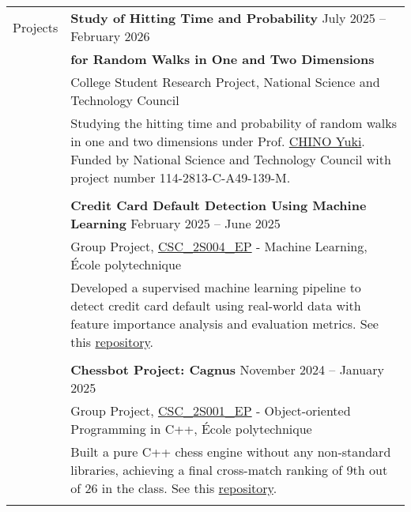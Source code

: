 \documentclass[letterpaper, 11pt]{article}
\begin{document}
\begin{center}
\begin{longtable}{p{0.76in}p{5.93in}}
        

        {\textcolor{OliveGreen}{Projects}} & \textbf{Study of Hitting Time and Probability} \hfill July 2025 -- February 2026\\
        & \textbf{\quad \quad \quad for Random Walks in One and Two Dimensions} \\
        & College Student Research Project, National Science and Technology Council\\
        & Studying the hitting time and probability of random walks in one and two dimensions under Prof. \href{https://scholar.nycu.edu.tw/en/persons/yuki-chino}{CHINO Yuki}. Funded by National Science and Technology Council with project number 114-2813-C-A49-139-M.\\
        & \\
        

        & \textbf{Credit Card Default Detection Using Machine Learning} \hfill February 2025 -- June 2025\\
        & Group Project, \href{https://synapses.polytechnique.fr/catalogue/2024-2025/ue/47/CSC-2S004-EP-machine-learning?from=D12}{CSC\_2S004\_EP} - Machine Learning, École polytechnique\\
        & Developed a supervised machine learning pipeline to detect credit card default using real-world data with feature importance analysis and evaluation metrics. See this \href{https://github.com/eiken59/ml_project/blob/main/README.md}{repository}.\\
        & \\

        & \textbf{Chessbot Project: Cagnus} \hfill November 2024 -- January 2025\\
        & Group Project, \href{https://synapses.polytechnique.fr/catalogue/2024-2025/ue/32/CSC-2F001-EP-object-oriented-programming-in-c?from=D12}{CSC\_2S001\_EP} - Object-oriented Programming in C++, École polytechnique\\
        & Built a pure C++ chess engine without any non-standard libraries, achieving a final cross-match ranking of 9th out of 26 in the class. See this \href{https://github.com/jetzypetz/chess_bot/blob/main/docs/README.md}{repository}.\\
        & \\
        

\end{longtable}
\end{center}
\end{document}
